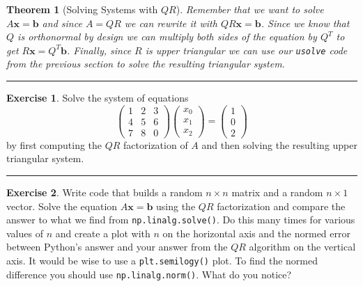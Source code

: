 \documentclass[
]{book}
\newtheorem{theorem}{Theorem}[chapter]
\theoremstyle{definition}
\theoremstyle{definition}
\theoremstyle{definition}
\newtheorem{exercise}{Exercise}[chapter]
\theoremstyle{remark}
\begin{document}
\begin{theorem}[Solving Systems with $QR$]
\protect\hypertarget{thm:unnamed-chunk-352}{}{\label{thm:unnamed-chunk-352} {} }Remember that we want to solve \(A \boldsymbol{x} = \boldsymbol{b}\) and since \(A = QR\) we can rewrite it with \(QR \boldsymbol{x} = \boldsymbol{b}\). Since we know that \(Q\) is orthonormal by design we can multiply both sides of the equation by \(Q^T\) to get \(R \boldsymbol{x} = Q^T \boldsymbol{b}\). Finally, since \(R\) is upper triangular we can use our \texttt{usolve} code from the previous section to solve the resulting triangular system.
\end{theorem}

\begin{center}\rule{0.5\linewidth}{0.5pt}\end{center}

\begin{exercise}
\protect\hypertarget{exr:unnamed-chunk-353}{}{\label{exr:unnamed-chunk-353} }Solve the system of equations
\[ \begin{pmatrix} 1 & 2 & 3 \\ 4 & 5 & 6 \\ 7 & 8 & 0 \end{pmatrix} \begin{pmatrix} x_0 \\ x_1 \\ x_2 \end{pmatrix} = \begin{pmatrix} 1 \\ 0 \\ 2 \end{pmatrix} \]
by first computing the \(QR\) factorization of \(A\) and then solving the resulting upper triangular system.
\end{exercise}

\begin{center}\rule{0.5\linewidth}{0.5pt}\end{center}

\begin{exercise}
\protect\hypertarget{exr:unnamed-chunk-354}{}{\label{exr:unnamed-chunk-354} }Write code that builds a random \(n \times n\) matrix and a random \(n \times 1\) vector. Solve the equation \(A \boldsymbol{x} = \boldsymbol{b}\) using the \(QR\) factorization and compare the answer to what we find from \texttt{np.linalg.solve()}. Do this many times for various values of \(n\) and create a plot with \(n\) on the horizontal axis and the normed error between Python's answer and your answer from the \(QR\) algorithm on the vertical axis. It would be wise to use a \texttt{plt.semilogy()} plot. To find the normed difference you should use \texttt{np.linalg.norm()}. What do you notice?
\end{exercise}
\end{document}
